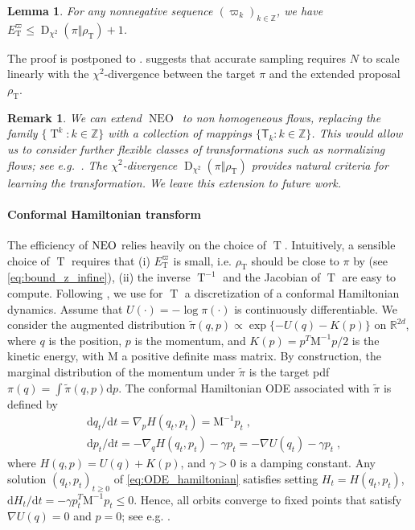 \documentclass{article}
\newtheorem{lemma}[lemma]{Lemma}
\newtheorem{remark}{Remark}
\def\mass{\mathrm{M}}
\def\IFIS{\ensuremath{\operatorname{NEO}}}
\def\InFiNE{{\small \IFIS}}
\def\transfo{\operatorname{T}}
\def\rmd{\operatorname{d}\hspace{-2pt}}
\def\rset{\mathbb{R}}
\def\rmd{\mathrm{d}}
\def\eqsp{\,}
\def\eg{\text{e.g.}}
\def\eqsp{\;}
\newcommand{\1}{\mathds{1}}
\def\eg{e.g.}
\def\target{\pi}
\def\rset{\mathbb{R}}
\def\zset{\mathbb{Z}}
\def\rmd{\mathrm{d}}
\def\rhoT{\rho_{\transfo}}
\begin{document}
\begin{lemma}
\label{lem:chi2_E_T}
For any nonnegative sequence $(\varpi_k)_{k\in\zset}$, we have
$ E^{\varpi}_{\transfo} \leq  \operatorname{D}_{\chi^2}( \pi \Vert \rhoT)+1$.
\end{lemma}
The proof is postponed to .  suggests that  accurate sampling requires $N$ to scale linearly with the $\chi^2$-divergence between the target $\pi$ and the extended proposal $\rhoT$.
\begin{remark}\em
We can extend \IFIS\ to non homogeneous flows, replacing the family $\{\transfo^k\colon k\in\zset\}$ with a collection of mappings $\{\mathsf{T}_k\colon k\in\zset\}$.
This would allow us to consider further flexible classes of transformations such as normalizing flows; see \eg\ \cite{papamakarios2019normalizing}. The $\chi^2$-divergence $\operatorname{D}_{\chi^2}( \pi \Vert \rhoT)$ provides natural criteria for learning the transformation.   We leave this extension to future work.
\end{remark}



\paragraph{Conformal Hamiltonian transform}
\label{subsec:NISestimators}
The efficiency of $\InFiNE$ relies heavily on the choice of $\transfo$. Intuitively, a sensible choice of
$\transfo$ requires that  (i) $E_{\transfo}^\varpi$ is small, i.e. $\rhoT$ should be close to $\pi$ by  (see \eqref{eq:bound_z_infine}), (ii) the inverse $\transfo^{-1}$ and the Jacobian of $\transfo$ are easy to compute. Following
\cite{rotskoff:vanden-eijden:2019}, we use for $\transfo$ a discretization of a conformal Hamiltonian dynamics.  Assume that $U(\cdot) = -\log \target(\cdot)$ is continuously differentiable. We consider the augmented distribution $\tilde\target(q,p) \propto \exp \{-U(q)-K(p)\}$
on  $\rset^{2d}$, where $q$ is the position, $p$ is the momentum, and $K(p)=p^T\mass^{-1} p/2$ is the kinetic energy, with $\mass$ a positive definite mass matrix. By construction, the marginal distribution of the momentum under $\tilde{\target}$ is the target pdf $\target(q)= \int \tilde{\target}(q,p) \rmd p$.  The conformal Hamiltonian ODE associated with $\tilde \target$ is defined by 
\begin{align}
  \label{eq:ODE_hamiltonian}
  &\rmd{q_t}/\rmd t =\nabla_{p} H(q_t,p_t) = \mass^{-1} p_t \eqsp, \\
  \nonumber
&\rmd {p}_t/\rmd t =-\nabla_{q} H(q_t,p_t)-\gamma p_t = -\nabla U(q_t) - \gamma p_t \eqsp,
\end{align}
where $H(q,p)= U(q)+ K(p)$, and $\gamma >0$ is a damping constant. Any solution $(q_t,p_t)_{t \geq 0}$ of \eqref{eq:ODE_hamiltonian} satisfies setting $H_t = H(q_t,p_t)$, $\rmd H_t/\rmd t   = - \gamma p_t^T\mass^{-1} p_t\leq 0$. Hence, all orbits converge to fixed points that satisfy $\nabla U(q)=0$ and $p=0$; see e.g. \cite{francca2019conformal,maddison2018hamiltonian}.
\end{document}
